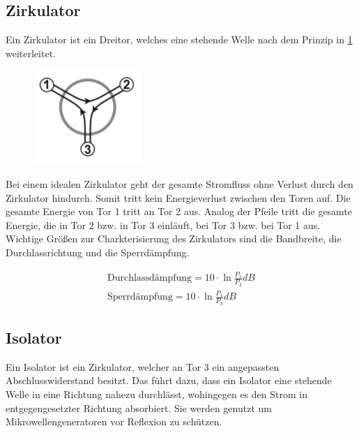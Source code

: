 \subsection{Zirkulator}
Ein Zirkulator ist ein Dreitor, welches eine stehende Welle nach dem Prinzip in \cref{ZB} weiterleitet.
\begin{figure}[h!]
	\centering
	\includegraphics[scale = 1]{Zirk-Bild.PNG}
	\caption{}
	\label{ZB}
\end{figure}
Bei einem idealen Zirkulator geht der gesamte Stromfluss ohne Verlust  durch den Zirkulator hindurch. Somit tritt kein Energieverlust zwischen den Toren auf. Die gesamte Energie von Tor 1 tritt an Tor 2 aus. Analog der Pfeile tritt die gesamte Energie, die in Tor 2 bzw. in Tor 3 einläuft, bei Tor 3 bzw. bei Tor 1 aus. Wichtige Größen zur Charkterisierung des Zirkulators sind die Bandbreite, die Durchlassrichtung und die Sperrdämpfung.

\begin{align}
\text{Durchlassdämpfung} = 10 \cdot \ln{\frac{P_1}{P_2}}dB \\
\text{Sperrdämpfung} =  10 \cdot \ln{\frac{P_1}{P_3}}dB 
\end{align}

\subsection{Isolator}
Ein Isolator ist ein Zirkulator, welcher an Tor 3 ein angepassten Abschlusswiderstand besitzt. Das führt dazu, dass ein Isolator eine stehende Welle in eine Richtung nahezu durchlässt, wohingegen es den Strom in entgegengesetzter Richtung absorbiert. Sie werden genutzt um Mikrowellengeneratoren vor Reflexion zu schützen.

